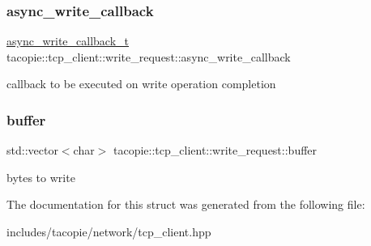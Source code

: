 \subsubsection{\texorpdfstring{async\+\_\+write\+\_\+callback}{async\_write\_callback}}
{\footnotesize\ttfamily \hyperlink{classtacopie_1_1tcp__client_ad48b8c8dff8a77490eb2e3e802c82b97}{async\+\_\+write\+\_\+callback\+\_\+t} tacopie\+::tcp\+\_\+client\+::write\+\_\+request\+::async\+\_\+write\+\_\+callback}

callback to be executed on write operation completion \mbox{\label{structtacopie_1_1tcp__client_1_1write__request_a4ee0c159b630c14f81d6b6d7d4b4e826}} 
\subsubsection{\texorpdfstring{buffer}{buffer}}
{\footnotesize\ttfamily std\+::vector$<$char$>$ tacopie\+::tcp\+\_\+client\+::write\+\_\+request\+::buffer}

bytes to write 

The documentation for this struct was generated from the following file\+:\begin{DoxyCompactItemize}
\item 
includes/tacopie/network/tcp\+\_\+client.\+hpp\end{DoxyCompactItemize}
